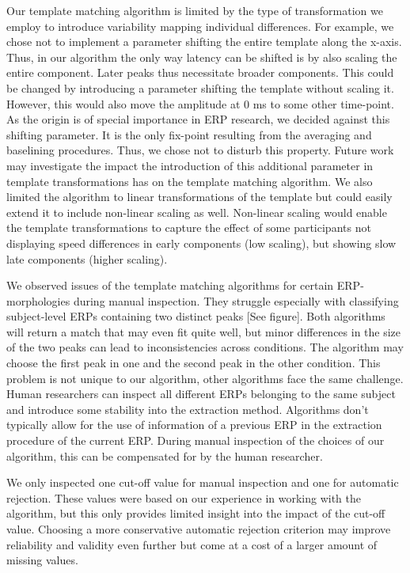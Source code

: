 \documentclass[
  man]{apa7}
\begin{document}
Our template matching algorithm is limited by the type of transformation we employ to introduce variability mapping individual differences. For example, we chose not to implement a parameter shifting the entire template along the x-axis. Thus, in our algorithm the only way latency can be shifted is by also scaling the entire component. Later peaks thus necessitate broader components. This could be changed by introducing a parameter shifting the template without scaling it. However, this would also move the amplitude at 0 ms to some other time-point. As the origin is of special importance in ERP research, we decided against this shifting parameter. It is the only fix-point resulting from the averaging and baselining procedures. Thus, we chose not to disturb this property. Future work may investigate the impact the introduction of this additional parameter in template transformations has on the template matching algorithm. We also limited the algorithm to linear transformations of the template but could easily extend it to include non-linear scaling as well. Non-linear scaling would enable the template transformations to capture the effect of some participants not displaying speed differences in early components (low scaling), but showing slow late components (higher scaling).

We observed issues of the template matching algorithms for certain ERP-morphologies during manual inspection. They struggle especially with classifying subject-level ERPs containing two distinct peaks {[}See figure{]}. Both algorithms will return a match that may even fit quite well, but minor differences in the size of the two peaks can lead to inconsistencies across conditions. The algorithm may choose the first peak in one and the second peak in the other condition. This problem is not unique to our algorithm, other algorithms face the same challenge. Human researchers can inspect all different ERPs belonging to the same subject and introduce some stability into the extraction method. Algorithms don't typically allow for the use of information of a previous ERP in the extraction procedure of the current ERP. During manual inspection of the choices of our algorithm, this can be compensated for by the human researcher.

We only inspected one cut-off value for manual inspection and one for automatic rejection. These values were based on our experience in working with the algorithm, but this only provides limited insight into the impact of the cut-off value. Choosing a more conservative automatic rejection criterion may improve reliability and validity even further but come at a cost of a larger amount of missing values.
\end{document}
